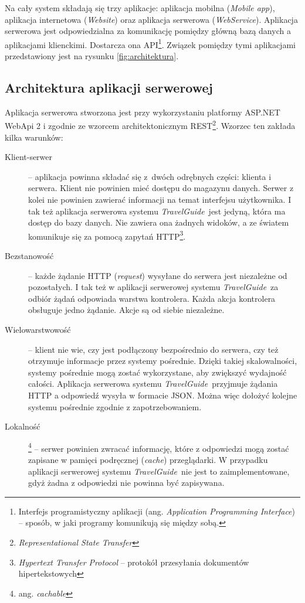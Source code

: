 \documentclass[a4paper]{book}
\newcommand{\appName}{\emph{TravelGuide}}
\begin{document}
		Na cały system składają się trzy aplikacje: aplikacja mobilna (\emph{Mobile app}), aplikacja internetowa (\emph{Website}) oraz aplikacja serwerowa (\emph{WebService}). Aplikacja serwerowa jest odpowiedzialna za komunikację pomiędzy główną bazą danych a aplikacjami klienckimi. Dostarcza ona API\footnote{Interfejs programistyczny aplikacji (ang. \textit{Application Programming Interface}) -- sposób, w jaki programy komunikują się między sobą.}. Związek pomiędzy tymi aplikacjami przedstawiony jest na rysunku \ref{fig:architektura}. 
			
			\subsection{Architektura aplikacji serwerowej}
			
			Aplikacja serwerowa stworzona jest przy wykorzystaniu platformy ASP.NET WebApi 2 i zgodnie ze wzorcem architektonicznym REST\footnote{\emph{Representational State Transfer}}. Wzorzec ten zakłada kilka warunków:
			
			\begin{description}
				
				\item[Klient-serwer] -- aplikacja powinna składać się z~dwóch odrębnych części: klienta i serwera. Klient nie powinien mieć dostępu do magazynu danych. Serwer z kolei nie powinien zawierać informacji na temat interfejsu użytkownika. I tak też aplikacja serwerowa systemu \appName\ jest jedyną, która ma dostęp do bazy danych. Nie zawiera ona żadnych widoków, a ze światem 				komunikuje się za pomocą zapytań HTTP\footnote{\emph{Hypertext Transfer Protocol} – protokół przesyłania dokumentów hipertekstowych}.
				\item[Bezstanowość] -- każde żądanie HTTP (\emph{request}) wysyłane do serwera jest niezależne od pozostałych. I tak też w aplikacji serwerowej systemu \appName\, za odbiór żądań odpowiada warstwa kontrolera. Każda akcja kontrolera obsługuje jedno żądanie. Akcje są od siebie niezależne.
				\item[Wielowarstwowość] -- klient nie wie, czy jest podłączony bezpośrednio do serwera, czy też otrzymuje informacje przez systemy pośrednie. Dzięki takiej skalowalności, systemy pośrednie mogą zostać wykorzystane, aby zwiększyć wydajność całości. Aplikacja serwerowa systemu \appName\ przyjmuje żądania HTTP a odpowiedź wysyła w formacie JSON. Można więc dołożyć kolejne systemu pośrednie zgodnie z zapotrzebowaniem. 
				\item[Lokalność]\footnote{ang. \textit{cachable}} -- serwer powinien zwracać informację, które z odpowiedzi mogą zostać zapisane w pamięci podręcznej (\emph{cache}) przeglądarki. W przypadku aplikacji serwerowej systemu \appName\ nie jest to zaimplementowane, gdyż żadna z odpowiedzi nie powinna być zapisywana.
				
			\end{description}
			
\end{document}

